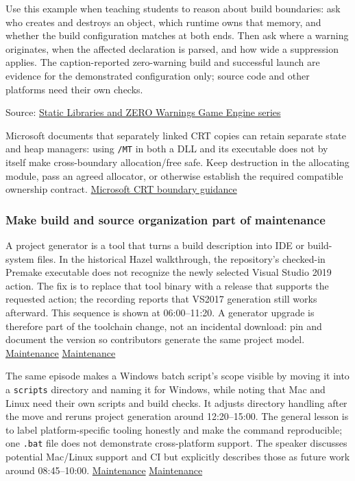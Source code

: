 Use this example when teaching students to reason about build boundaries: ask who creates and destroys an object, which runtime owns that memory, and whether the build configuration matches at both ends. Then ask where a warning originates, when the affected declaration is parsed, and how wide a suppression applies. The caption-reported zero-warning build and successful launch are evidence for the demonstrated configuration only; source code and other platforms need their own checks.

Source: \href{https://www.youtube.com/watch?v=TlvmnoDlrI0}{Static Libraries and ZERO Warnings \textbar{} Game Engine series}

Microsoft documents that separately linked CRT copies can retain separate state and heap managers: using \texttt{/MT} in both a DLL and its executable does not by itself make cross-boundary allocation/free safe. Keep destruction in the allocating module, pass an agreed allocator, or otherwise establish the required compatible ownership contract. \href{https://learn.microsoft.com/en-us/cpp/c-runtime-library/potential-errors-passing-crt-objects-across-dll-boundaries?view=msvc-170}{Microsoft CRT boundary guidance}

\subsubsection{Make build and source organization part of maintenance}\label{make-build-and-source-organization-part-of-maintenance}

A project generator is a tool that turns a build description into IDE or build-system files. In the historical Hazel walkthrough, the repository's checked-in Premake executable does not recognize the newly selected Visual Studio 2019 action. The fix is to replace that tool binary with a release that supports the requested action; the recording reports that VS2017 generation still works afterward. This sequence is shown at 06:00--11:20. A generator upgrade is therefore part of the toolchain change, not an incidental download: pin and document the version so contributors generate the same project model. \href{https://www.youtube.com/watch?v=e9uTV44oOiw&t=360s}{Maintenance} \href{https://www.youtube.com/watch?v=e9uTV44oOiw&t=600s}{Maintenance}

The same episode makes a Windows batch script's scope visible by moving it into a \texttt{scripts} directory and naming it for Windows, while noting that Mac and Linux need their own scripts and build checks. It adjusts directory handling after the move and reruns project generation around 12:20--15:00. The general lesson is to label platform-specific tooling honestly and make the command reproducible; one \texttt{.bat} file does not demonstrate cross-platform support. The speaker discusses potential Mac/Linux support and CI but explicitly describes those as future work around 08:45--10:00. \href{https://www.youtube.com/watch?v=e9uTV44oOiw&t=740s}{Maintenance} \href{https://www.youtube.com/watch?v=e9uTV44oOiw&t=525s}{Maintenance}

